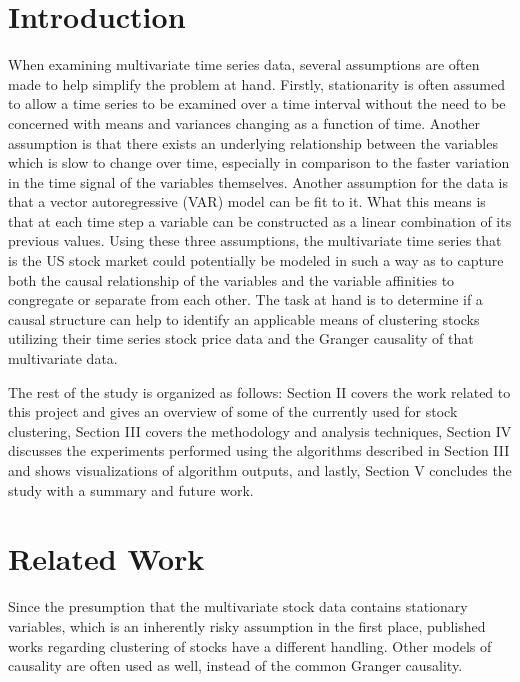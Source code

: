 \documentclass[conference]{IEEEtran}
\begin{document}
\section{Introduction}
When examining multivariate time series data, several assumptions are often made to help simplify the problem at hand. Firstly, stationarity is often assumed to allow a time series to be examined over a time interval without the need to be concerned with means and variances changing as a function of time. Another assumption is that there exists an underlying relationship between the variables which is slow to change over time, especially in comparison to the faster variation in the time signal of the variables themselves. Another assumption for the data is that a vector autoregressive (VAR) model can be fit to it. What this means is that at each time step a variable can be constructed as a linear combination of its previous values. Using these three assumptions, the multivariate time series that is the US stock market could potentially be modeled in such a way as to capture both the causal relationship of the variables and the variable affinities to congregate or separate from each other. The task at hand is to determine if a causal structure can help to identify an applicable means of clustering stocks utilizing their time series stock price data and the Granger causality of that multivariate data.

The rest of the study is organized as follows: Section II covers the work related to this project and gives an overview of some of the currently used for stock clustering, Section III covers the methodology and analysis techniques, Section IV discusses the experiments performed using the algorithms described in Section III and shows visualizations of algorithm outputs, and lastly, Section V concludes the study with a summary and future work.

\section{Related Work}
Since the presumption that the multivariate stock data contains stationary variables, which is an inherently risky assumption in the first place, published works regarding clustering of stocks have a different handling. Other models of causality are often used as well, instead of the common Granger causality.
\end{document}
